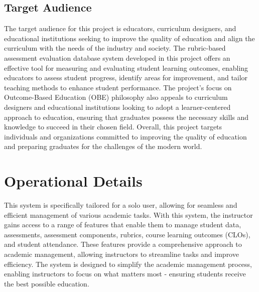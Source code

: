 \documentclass[12pt,a4paper]{article}
\begin{document}
\subsection{Target Audience}
The target audience for this project is educators, curriculum designers, and educational institutions seeking to improve the quality of education and align the curriculum with the needs of the industry and society. The rubric-based assessment evaluation database system developed in this project offers an effective tool for measuring and evaluating student learning outcomes, enabling educators to assess student progress, identify areas for improvement, and tailor teaching methods to enhance student performance. The project's focus on Outcome-Based Education (OBE) philosophy also appeals to curriculum designers and educational institutions looking to adopt a learner-centered approach to education, ensuring that graduates possess the necessary skills and knowledge to succeed in their chosen field. Overall, this project targets individuals and organizations committed to improving the quality of education and preparing graduates for the challenges of the modern world.


\newpage
\section{Operational Details}
This system is specifically tailored for a solo user, allowing for seamless and efficient management of various academic tasks. With this system, the instructor gains access to a range of features that enable them to manage student data, assessments, assessment components, rubrics, course learning outcomes (CLOs), and student attendance. These features provide a comprehensive approach to academic management, allowing instructors to streamline tasks and improve efficiency. The system is designed to simplify the academic management process, enabling instructors to focus on what matters most - ensuring students receive the best possible education.

\end{document}
